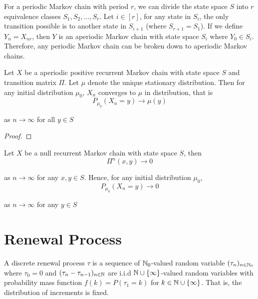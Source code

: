 \documentclass{report}
\begin{document}
\begin{remark}
    For a periodic Markov chain with period $r$, we can divide the state space $S$ into $r$ equivalence classes $S_1, S_2, ..., S_r$. Let $i \in [r]$, for any state in $S_i$, the only transition possible is to another state in $S_{i+1}$ (where $S_{r+1} = S_1$). If we define $Y_n = X_{nr}$, then $Y$ is an aperiodic Markov chain with state space $S_i$ where $Y_0 \in S_i$. Therefore, any periodic Markov chain can be broken down to aperiodic Markov chains.
\end{remark}

\begin{theorem}
    Let $X$ be a aperiodic positive recurrent Markov chain with state space $S$ and transition matrix $\Pi$. Let $\mu$ denote the unique stationary distribution. Then for any initial distribution $\mu_0$, $X_n$ converges to $\mu$ in distribution, that is
    $$
        P_{\mu_0}(X_n = y) \to \mu(y)
    $$

    as $n \to \infty$ for all $y \in S$
\begin{proof}
\end{proof}

\end{theorem}

\begin{theorem}
    Let $X$ be a null recurrent Markov chain with state space $S$, then
    $$
        \Pi^n(x, y) \to 0
    $$

    as $n \to \infty$ for any $x, y \in S$. Hence, for any initial distribution $\mu_0$,
    $$
        P_{\mu_0}(X_n = y) \to 0
    $$

    as $n \to \infty$ for any $y \in S$
\end{theorem}

\section{Renewal Process}

\begin{definition}
    A discrete renewal process $\tau$ is a sequence of $\mathbb{N}_0$-valued random variable $(\tau_n)_{n \in \mathbb{N}_0}$ where $\tau_0 = 0$ and $(\tau_n - \tau_{n-1})_{n \in \mathbb{N}}$ are i.i.d $\mathbb{N} \cup \{\infty\}$-valued random variables with probability mass function $f(k) = P(\tau_1 = k)$ for $k \in \mathbb{N} \cup \{\infty\}$. That is, the distribution of increments is fixed.
\end{definition}
\end{document}
